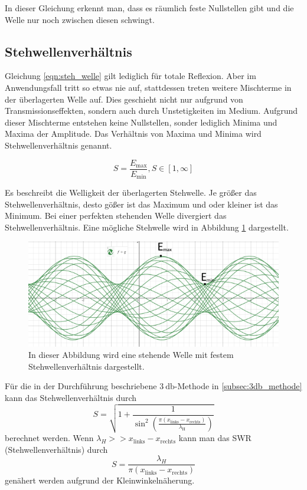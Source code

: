In dieser Gleichung erkennt man, dass es räumlich feste Nullstellen gibt und die Welle nur noch zwischen diesen schwingt.

\subsection{Stehwellenverhältnis}
\label{subsec:Stehwellenverhaeltnis}
Gleichung \ref{eqn:steh_welle} gilt lediglich für totale Reflexion. Aber im Anwendungsfall tritt so etwas nie auf, stattdessen treten weitere Mischterme in der überlagerten Welle auf.
Dies geschieht nicht nur aufgrund von Transmissionseffekten, sondern auch durch Unstetigkeiten im Medium. Aufgrund dieser Mischterme entstehen keine Nullstellen, sonder
lediglich Minima und Maxima der Amplitude. Das Verhältnis von Maxima und Minima wird Stehwellenverhältnis genannt.

\begin{equation}
              \label{eqn:SWR}
              S = \frac{E_\mathrm{max}}{E_\mathrm{min}}, S\in[1,\infty]
\end{equation}

Es beschreibt die Welligkeit der überlagerten Stehwelle. Je größer
das Stehwellenverhältnis, desto gößer ist das Maximum und oder kleiner ist das Minimum. Bei einer perfekten stehenden Welle divergiert das Stehwellenverhältnis. Eine mögliche
Stehwelle wird in Abbildung \ref{fig:stehwelle} dargestellt.

\begin{figure}
              \centering
              \includegraphics[width = .9\textwidth]{content/stehwelle.PNG}
              \caption{In dieser Abbildung wird eine stehende Welle mit festem Stehwellenverhältnis dargestellt.}
              \label{fig:stehwelle}
\end{figure}

Für die in der Durchführung beschriebene $\qty{3}{\decibel}$-Methode in \autoref{subsec:3db_methode} kann das Stehwellenverhältnis durch 
\begin{equation}
              \label{eqn:S_3dB}
              S = \sqrt{1+\frac{1}{\sin^2\left(\frac{\pi(x_\mathrm{links}-x_\mathrm{rechts})}{\lambda_\mathrm{H}}\right)}}
\end{equation}
berechnet werden. Wenn $\lambda_H >> x_\mathrm{links}-x_\mathrm{rechts}$ kann man das SWR (Stehwellenverhältnis) durch 
\begin{equation}
              \label{eqn:S_3dB_easy}
              S = \frac{\lambda_H}{\pi(x_\mathrm{links}-x_\mathrm{rechts})}
\end{equation}
genähert werden aufgrund der Kleinwinkelnäherung.


